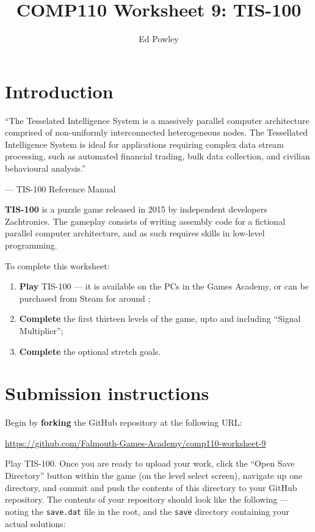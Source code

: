 \documentclass{../../../fal_assignment}
\title{COMP110 Worksheet 9: TIS-100}
\author{Ed Powley}
\begin{document}
\maketitle

\section*{Introduction}

\begin{marginquote}
``The Tesselated Intelligence System is a massively parallel computer architecture comprised of non-uniformly
interconnected heterogeneous nodes. The Tessellated Intelligence System is ideal for applications requiring complex
data stream processing, such as automated financial trading, bulk data collection, and civilian behavioural analysis.''

--- TIS-100 Reference Manual
\end{marginquote}

\textbf{TIS-100} is a puzzle game released in 2015 by independent developers Zachtronics.
The gameplay consists of writing assembly code for a fictional parallel computer architecture,
and as such requires skills in low-level programming.

To complete this worksheet:
\begin{enumerate}[label=(\alph*)]
	\item \textbf{Play} TIS-100 --- it is available on the PCs in the Games Academy, or can be purchased from Steam for around ;
 	\item \textbf{Complete} the first thirteen levels of the game, upto and including ``Signal Multiplier'';
 	\item \textbf{Complete} the optional stretch goals.
\end{enumerate}

\section*{Submission instructions}

Begin by \textbf{forking} the GitHub repository at the following URL:

\url{https://github.com/Falmouth-Games-Academy/comp110-worksheet-9}

Play TIS-100.
Once you are ready to upload your work, click the ``Open Save Directory'' button within the game (on the level select screen),
navigate up one directory, and commit and push the contents of this directory to your GitHub repository.
The contents of your repository should look like the following --- noting the \texttt{save.dat} file in the root,
and the \texttt{save} directory containing your actual solutions:
\end{document}
